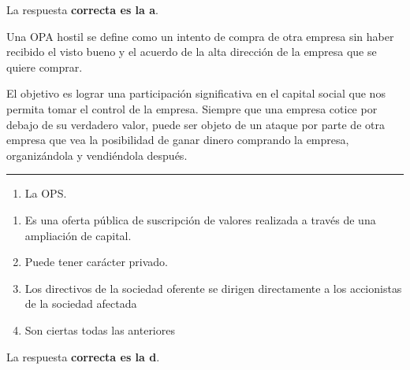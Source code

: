 \documentclass[
  letterpaper,
  DIV=11,
  numbers=noendperiod]{scrreprt}
\providecommand{\tightlist}{%
  \setlength{\itemsep}{0pt}\setlength{\parskip}{0pt}}\usepackage{longtable,booktabs,array}
\begin{document}
\begin{tcolorbox}[enhanced jigsaw, left=2mm, opacityback=0, colback=white, breakable, arc=.35mm, bottomrule=.15mm, rightrule=.15mm, toprule=.15mm, leftrule=.75mm, colframe=quarto-callout-tip-color-frame]
\begin{minipage}[t]{5.5mm}
\textcolor{quarto-callout-tip-color}{\faLightbulb}
\end{minipage}%
\begin{minipage}[t]{\textwidth - 5.5mm}

La respuesta \textbf{correcta es la a}.

Una OPA hostil se define como un intento de compra de otra empresa sin
haber recibido el visto bueno y el acuerdo de la alta dirección de la
empresa que se quiere comprar.

El objetivo es lograr una participación significativa en el capital
social que nos permita tomar el control de la empresa. Siempre que una
empresa cotice por debajo de su verdadero valor, puede ser objeto de un
ataque por parte de otra empresa que vea la posibilidad de ganar dinero
comprando la empresa, organizándola y vendiéndola después.

\end{minipage}%
\end{tcolorbox}

\begin{center}\rule{0.5\linewidth}{0.5pt}\end{center}

\begin{enumerate}
\def\labelenumi{\arabic{enumi}.}
\setcounter{enumi}{41}
\tightlist
\item
  La OPS.
\end{enumerate}

\begin{enumerate}
\def\labelenumi{\alph{enumi})}
\item
  Es una oferta pública de suscripción de valores realizada a través de
  una ampliación de capital.
\item
  Puede tener carácter privado.
\item
  Los directivos de la sociedad oferente se dirigen directamente a los
  accionistas de la sociedad afectada
\item
  Son ciertas todas las anteriores
\end{enumerate}

\begin{tcolorbox}[enhanced jigsaw, left=2mm, opacityback=0, colback=white, breakable, arc=.35mm, bottomrule=.15mm, rightrule=.15mm, toprule=.15mm, leftrule=.75mm, colframe=quarto-callout-tip-color-frame]
\begin{minipage}[t]{5.5mm}
\textcolor{quarto-callout-tip-color}{\faLightbulb}
\end{minipage}%
\begin{minipage}[t]{\textwidth - 5.5mm}

La respuesta \textbf{correcta es la d}.

\end{minipage}%
\end{tcolorbox}
\end{document}
